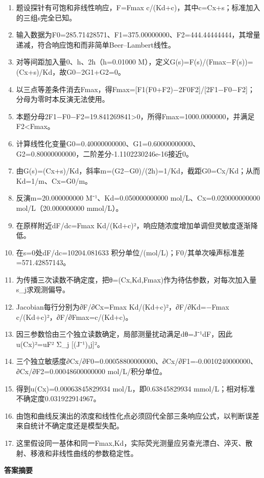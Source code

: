 \documentclass[UTF8,11pt,a4paper]{ctexart}
\begin{document}
\begin{enumerate}
\item 题设探针有可饱和非线性响应，F=Fmax c/(Kd+c)，其中c=Cx+s；标准加入的三组s完全已知。
\item 输入数据为F0=285.71428571、F1=375.00000000、F2=444.44444444，其增量递减，符合响应饱和而非简单Beer–Lambert线性。
\item 对等间距加入量0、h、2h（h=0.01000 M），定义G(s)=F(s)/(Fmax−F(s))=(Cx+s)/Kd，故G0−2G1+G2=0。
\item 以三点等差条件消去Fmax，得Fmax=[F1(F0+F2)−2F0F2]/[2F1−F0−F2]；分母为零时本反演无法使用。
\item 本题分母2F1−F0−F2=19.841269841>0，所得Fmax=1000.0000000，并满足F2<Fmax。
\item 计算线性化变量G0=0.40000000000、G1=0.60000000000、G2=0.80000000000，二阶差分-1.1102230246e-16接近0。
\item 由G(s)=(Cx+s)/Kd，斜率m=(G2−G0)/(2h)=1/Kd，截距G0=Cx/Kd；从而Kd=1/m、Cx=G0/m。
\item 反演m=20.000000000 M⁻¹、Kd=0.050000000000 mol/L、Cx=0.020000000000 mol/L（20.000000000 mmol/L）。
\item 在原样附近dF/dc=Fmax Kd/(Kd+c)²，响应随浓度增加单调但灵敏度逐渐降低。
\item 在s=0处dF/dc=10204.081633 积分单位/(mol/L)；F0/其单次噪声标准差=571.42857143。
\item 为传播三次读数不确定度，把θ=(Cx,Kd,Fmax)作为待估参数，对每次加入量s\_j求观测偏导。
\item Jacobian每行分别为∂F/∂Cx=Fmax Kd/(Kd+c)²，∂F/∂Kd=−Fmax c/(Kd+c)²，∂F/∂Fmax=c/(Kd+c)。
\item 因三参数恰由三个独立读数确定，局部测量扰动满足dθ=J⁻¹dF，因此u(Cx)²=uF² Σ\_j [(J⁻¹)₁j]²。
\item 三个独立敏感度∂Cx/∂F0=0.00058800000000、∂Cx/∂F1=-0.0010240000000、∂Cx/∂F2=0.00048600000000 mol/L/积分单位。
\item 得到u(Cx)=0.00063845829934 mol/L，即0.63845829934 mmol/L；相对标准不确定度0.031922914967。
\item 由饱和曲线反演出的浓度和线性化点必须回代全部三条响应公式，以判断误差来自统计不确定度还是模型失配。
\item 这里假设同一基体和同一Fmax,Kd，实际荧光测量应另查光漂白、淬灭、散射、移液和非线性曲线的参数稳定性。
\end{enumerate}
\noindent\textbf{答案摘要}\par
\end{document}
